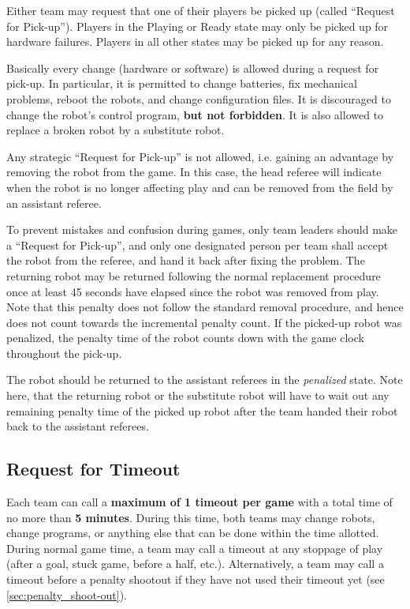 \documentclass[12pt]{article}
\begin{document}
Either team may request that one of their players be picked up (called ``Request for Pick-up'').  Players in the Playing or Ready state may only be picked up for hardware failures.  Players in all other states may be picked up for any reason.

Basically every change (hardware or software) is allowed during a request for pick-up. In particular,
it is permitted to change batteries, fix mechanical problems, reboot the robots, and change configuration files.
It is discouraged to change the robot's control program, \textbf{but not forbidden}.
It is also allowed to replace a broken robot by a substitute robot.

Any strategic ``Request for Pick-up'' is not allowed, i.e. gaining an advantage by removing the robot from the game.
In this case, the head referee will indicate when the robot is no longer affecting play and can be removed from the field by an assistant referee.

To prevent mistakes and confusion during games, only team leaders should make a ``Request for Pick-up'', and only one designated person per team shall accept the robot from the referee, and hand it back after fixing the problem.
The returning robot may be returned following the normal replacement procedure once at least 45 seconds have elapsed since the robot was removed from play.
Note that this penalty does not follow the standard removal procedure, and hence does not count towards the incremental penalty count. 
If the picked-up robot was penalized, the penalty time of the robot counts down with the game clock throughout the pick-up.

The robot should be returned to the assistant referees in the \emph{penalized} state.
Note here, that the returning robot or the substitute robot will have to wait out any remaining penalty time of the picked up robot after the team handed their robot back to the assistant referees.

\subsection{Request for Timeout}
\label{sec:request_for_timeout}

Each team can call a \textbf{maximum of 1 timeout per game} with a total time of no more than \textbf{5 minutes}. During this time, both teams may change robots, change programs, or anything else that can be done within the time allotted.  During normal game time, a team may call a timeout at any stoppage of play (after a goal, stuck game, before a half, etc.). Alternatively, a team may call a timeout before a penalty shootout if they have not used their timeout yet (see \ref{sec:penalty_shoot-out}).
\end{document}
